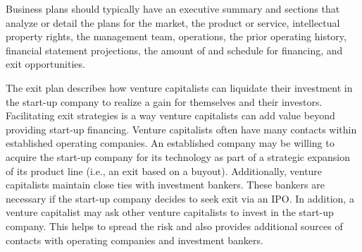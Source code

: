 \documentclass[11pt]{article}
\begin{document}
Business plans should typically have an executive summary and sections that analyze or detail the plans for the market, the product or service, intellectual property rights, the management team, operations, the prior operating history, financial statement projections, the amount of and schedule for financing, and exit opportunities.

The exit plan describes how venture capitalists can liquidate their investment in the start-up company to realize a gain for themselves and their investors. Facilitating exit strategies is a way venture capitalists can add value beyond providing start-up financing. Venture capitalists often have many contacts within established operating companies. An established company may be willing to acquire the start-up company for its technology as part of a strategic expansion of its product line (i.e., an exit based on a buyout). Additionally, venture capitalists maintain close ties with investment bankers. These bankers are necessary if the start-up company decides to seek exit via an IPO. In addition, a venture capitalist may ask other venture capitalists to invest in the start-up company. This helps to spread the risk and also provides additional sources of contacts with operating companies and investment bankers.
\end{document}
